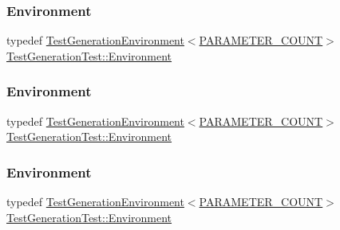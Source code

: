 \subsubsection{\texorpdfstring{Environment}{Environment}\hspace{0.1cm}{\footnotesize\ttfamily [1/3]}}
{\footnotesize\ttfamily typedef \mbox{\hyperlink{class_test_generation_environment}{Test\+Generation\+Environment}}$<$\mbox{\hyperlink{class_test_generation_test_a2428a54a0382f6da86eda1bbe01144d5a6c6e91a1d2c5dc9dc65fa575d368be76}{P\+A\+R\+A\+M\+E\+T\+E\+R\+\_\+\+C\+O\+U\+NT}}$>$ \mbox{\hyperlink{class_test_generation_test_aeff004d79bbb376d7acecd28f9fb71c6}{Test\+Generation\+Test\+::\+Environment}}}

\mbox{\label{class_test_generation_test_aeff004d79bbb376d7acecd28f9fb71c6}} 
\subsubsection{\texorpdfstring{Environment}{Environment}\hspace{0.1cm}{\footnotesize\ttfamily [2/3]}}
{\footnotesize\ttfamily typedef \mbox{\hyperlink{class_test_generation_environment}{Test\+Generation\+Environment}}$<$\mbox{\hyperlink{class_test_generation_test_a2428a54a0382f6da86eda1bbe01144d5a6c6e91a1d2c5dc9dc65fa575d368be76}{P\+A\+R\+A\+M\+E\+T\+E\+R\+\_\+\+C\+O\+U\+NT}}$>$ \mbox{\hyperlink{class_test_generation_test_aeff004d79bbb376d7acecd28f9fb71c6}{Test\+Generation\+Test\+::\+Environment}}}

\mbox{\label{class_test_generation_test_aeff004d79bbb376d7acecd28f9fb71c6}} 
\subsubsection{\texorpdfstring{Environment}{Environment}\hspace{0.1cm}{\footnotesize\ttfamily [3/3]}}
{\footnotesize\ttfamily typedef \mbox{\hyperlink{class_test_generation_environment}{Test\+Generation\+Environment}}$<$\mbox{\hyperlink{class_test_generation_test_a2428a54a0382f6da86eda1bbe01144d5a6c6e91a1d2c5dc9dc65fa575d368be76}{P\+A\+R\+A\+M\+E\+T\+E\+R\+\_\+\+C\+O\+U\+NT}}$>$ \mbox{\hyperlink{class_test_generation_test_aeff004d79bbb376d7acecd28f9fb71c6}{Test\+Generation\+Test\+::\+Environment}}}



